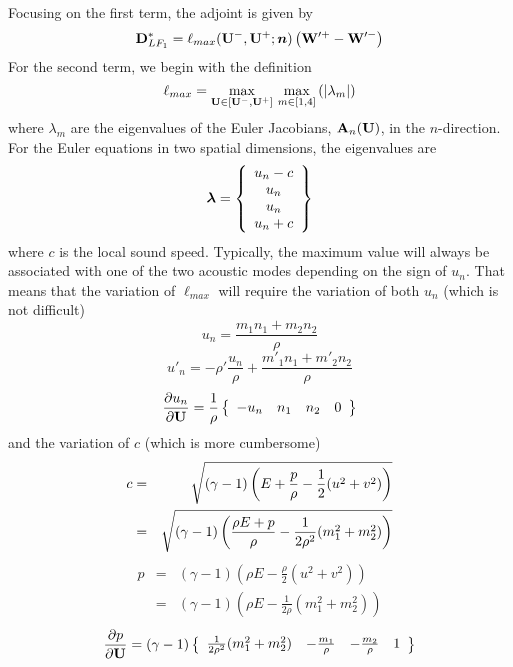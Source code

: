 \documentclass[12pt]{article}
\begin{document}
Focusing on the first term, the adjoint is given by
\begin{equation}
{\bf D}^*_{LF_1}  = \ell_{max}({{\bf U}}^-,{{\bf U}}^+;{\boldsymbol n})\left( {\bf W}'^+ - {\bf W}'^- \right)
\end{equation}
For the second term, we begin with the definition
\begin{equation}
\ell_{max} = \max_{{{\bf U}}\in[{{\bf U}}^-,{{\bf U}}^+]} \, \max_{m\in[1,4]}
             \left( |\lambda_m| \right)
\end{equation}
where $\lambda_m$ are the eigenvalues of the Euler Jacobians, ${\bf A}_n({{\bf U}})$, in
the $n$-direction.  For the Euler equations in two spatial dimensions, the
eigenvalues are
\begin{equation}
{\boldsymbol\lambda} = \left\{ \begin{array}{c} u_n - c \\ u_n \\ u_n \\ u_n + c
\end{array} \right\}
\end{equation}
where $c$ is the local sound speed.  Typically, the maximum value will always
be associated with one of the two acoustic modes depending on the sign of
$u_n$.  That means that the variation of $\ell_{max}$ will require the
variation of both $u_n$ (which is not difficult) 
\[ u_n = \frac{m_1 n_1 + m_2 n_2}{\rho} \]
\[ u'_n = -\rho'\frac{u_n}{\rho} + \frac{ m'_1 n_1 + m'_2 n_2 }{\rho} \]
\begin{equation}
\frac{\partial u_n}{\partial{{\bf U}}} = \frac{1}{\rho}\left\{\begin{array}{cccc}
-u_n & n_1 & n_2 & 0 
\end{array}\right\}
\end{equation}
and the variation of $c$ (which is more cumbersome)
\begin{eqnarray}
c&=&\sqrt{ (\gamma-1) \left( E + \frac{p}{\rho} - 
            \frac{1}{2}( u^2 + v^2 )\right) } \nonumber\\
 &=&\sqrt{ (\gamma-1) \left( \frac{\rho E + p}{\rho} - 
                             \frac{1}{2\rho^2}( m_1^2 + m_2^2 ) \right) }
\end{eqnarray}
\begin{eqnarray} 
p &=& (\gamma-1)\left( \rho E - \frac{\rho}{2}(u^2 + v^2)\right) \nonumber\\
  &=& (\gamma-1)\left( \rho E - \frac{1}{2\rho}(m_1^2 + m_2^2) \right)
\end{eqnarray}
\begin{equation}\frac{\partial p}{\partial {{\bf U}}} = 
(\gamma-1)\left\{
\begin{array}{cccc}
\frac{1}{2\rho^2}(m_1^2 + m_2^2) & -\frac{m_1}{\rho} & -\frac{m_2}{\rho} & 1 
\end{array}
\right\}
\end{equation}
\end{document}
